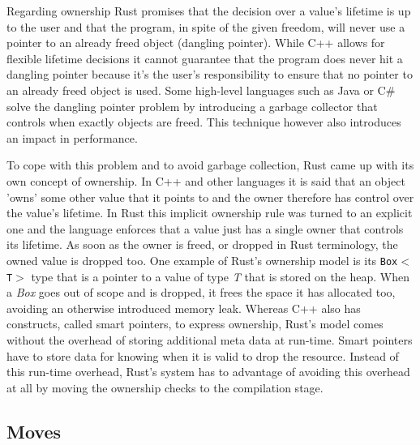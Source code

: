 Regarding ownership Rust promises that the decision over a value's lifetime is up to the user and that the program, in spite of the given freedom, will never use a pointer to an already freed object (dangling pointer). While C++ allows for flexible lifetime decisions it cannot guarantee that the program does never hit a dangling pointer because it's the user's responsibility to ensure that no pointer to an already freed object is used.
Some high-level languages such as Java or C\# solve the dangling pointer problem by introducing a garbage collector that controls when exactly objects are freed. This technique however also introduces an impact in performance.

To cope with this problem and to avoid garbage collection, Rust came up with its own concept of ownership. In C++ and other languages it is said that an object 'owns' some other value that it points to and the owner therefore has control over the value's lifetime. In Rust this implicit ownership rule was turned to an explicit one and the language enforces that a value just has a single owner that controls its lifetime. As soon as the owner is freed, or dropped in Rust terminology, the owned value is dropped too. One example of Rust's ownership model is its \texttt{Box$<$T$>$} type that is a pointer to a value of type \textit{T} that is stored on the heap. When a \textit{Box} goes out of scope and is dropped, it frees the space it has allocated too, avoiding an otherwise introduced memory leak. \cite[Chapter 4. Ownership]{ProRus}
Whereas C++ also has constructs, called smart pointers, to express ownership, Rust's model comes without the overhead of storing additional meta data at run-time. Smart pointers have to store data for knowing when it is valid to drop the resource. Instead of this run-time overhead, Rust's system has to advantage of avoiding this overhead at all by moving the ownership checks to the compilation stage.

\subsection{Moves}

